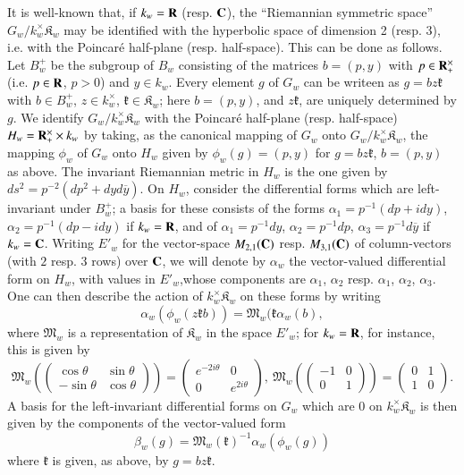It is well-known that, if $k_{w}=\mathbf{R}$ (resp. $\mathbf{C}$), the ``Riemannian symmetric space'' $G_{w}/k^{\times}_{w}\mathfrak{K}_{w}$ may be identified with the hyperbolic space of dimension 2 (resp. 3), i.e. with the Poincar\'e half-plane (resp. half-space). This can be done as follows. Let $B^{+}_{w}$ be the subgroup of $B_{w}$ consisting of the matrices $b=(p,y)$ with $p\in \mathbf{R}^{\times}_{+}$ (i.e. $p\in \mathbf{R}$, $p>0$) and $y\in k_{w}$. Every element $g$ of $G_{w}$ can be writeen as $g=bz\mathfrak{k}$ with $b\in B^{+}_{w}$, $z\in k^{\times}_{w}$, $\mathfrak{k}\in \mathfrak{K}_{w}$; here $b=(p,y)$, and $z\mathfrak{k}$, are uniquely determined by $g$. We identify $G_{w}/k^{\times}_{w}\mathfrak{K}_{w}$ with the Poincar\'e half-plane (resp. half-space) $H_{w}=\mathbf{R}^{\times}_{+}\times k_{w}$ by taking, as the canonical mapping of $G_{w}$ onto $G_{w}/k^{\times}_{w}\mathfrak{K}_{w}$, the mapping $\phi_{w}$ of $G_{w}$ onto $H_{w}$ given by $\phi_{w}(g)=(p,y)$ for $g=bz\mathfrak{k}$, $b=(p,y)$ as above. The invariant Riemannian metric in $H_{w}$ is the one given by $ds^{2}=p^{-2}(dp^{2}+dyd\overline{y})$. On $H_{w}$, consider the differential forms which are left-invariant under $B^{+}_{w}$; a basis for these consists of the forms $\alpha_{1}=p^{-1}(dp+idy)$, $\alpha_{2}=p^{-1}(dp-idy)$ if $k_{w}=\mathbf{R}$, and of $\alpha_{1}=p^{-1}dy$, $\alpha_{2}=p^{-1}dp$, $\alpha_{3}=p^{-1}d\overline{y}$ if $k_{w}=\mathbf{C}$. Writing $E'_{w}$ for the vector-space $M_{2,1}(\mathbf{C})$ resp. $M_{3,1}(\mathbf{C})$ of column-vectors (with $2$ resp. $3$ rows) over $\mathbf{C}$, we will denote by $\alpha_{w}$ the vector-valued differential form on $H_{w}$, with values in $E'_{w}$,\pageoriginale whose components are $\alpha_{1}$, $\alpha_{2}$ resp. $\alpha_{1}$, $\alpha_{2}$, $\alpha_{3}$. One can then describe the action of $k^{\times}_{w}\mathfrak{K}_{w}$ on these forms by writing
$$
\alpha_{w}(\phi_{w}(z\mathfrak{k}b))=\mathfrak{M}_{w}(\mathfrak{k}\alpha_{w}(b),
$$
where $\mathfrak{M}_{w}$ is a representation of $\mathfrak{K}_{w}$ in the space $E'_{w}$; for $k_{w}=\mathbf{R}$, for instance, this is given by
{\fontsize{10}{12}\selectfont
$$
\mathfrak{M}_{w}
\left(\left(\begin{matrix}
\cos \theta & \sin \theta\\
-\sin \theta & \cos \theta
\end{matrix}\right)\right)=
\left(
\begin{matrix}
e^{-2i\theta} & 0\\
0 & e^{2i\theta}
\end{matrix}
\right), \  
\mathfrak{M}_{w}
\left(\left(
\begin{matrix}
-1 & 0\\
0 & 1
\end{matrix}
\right)\right)
=
\left(
\begin{matrix}
0 & 1\\
1 & 0
\end{matrix}
\right).
$$}\relax
A basis for the left-invariant differential forms on $G_{w}$ which are $0$ on $k^{\times}_{w}\mathfrak{K}_{w}$ is then given by the components of the vector-valued form
$$
\beta_{w}(g)=\mathfrak{M}_{w}(\mathfrak{k})^{-1}\alpha_{w}(\phi_{w}(g))
$$
where $\mathfrak{k}$ is given, as above, by $g=bz \mathfrak{k}$.

